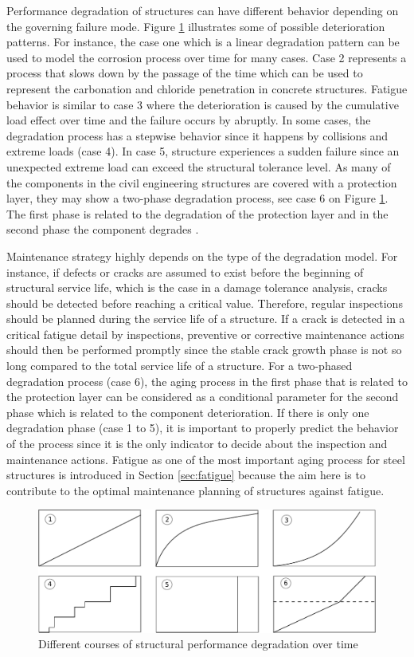Performance degradation of structures can have different behavior depending on the governing failure mode. Figure \ref{fig:degradation} illustrates some of possible 
deterioration patterns. For instance, the case one which is a linear degradation pattern can be used to model the corrosion process over time for many cases. 
Case 2 represents a process that slows down by the passage of the time which can be used to represent the carbonation and chloride penetration in concrete structures.
Fatigue behavior is similar to case 3 where the deterioration is caused by the cumulative load effect over time and the failure occurs by abruptly. 
In some cases, the degradation process has a stepwise behavior since it happens by collisions and extreme loads (case 4). In case 5, structure
experiences a sudden failure since an unexpected extreme load can exceed the structural tolerance level. As many of the components in the civil engineering structures are 
covered with a protection layer, they may show a two-phase degradation process, see case 6 on Figure \ref{fig:degradation}. The first phase is related to the degradation of the 
protection layer and in the second phase the component degrades \citep{Van1994}. 

Maintenance strategy highly depends on the type of the degradation model. 
For instance, if defects or cracks are assumed to exist before the beginning of structural service life, which is the case in a damage tolerance analysis, cracks should be detected 
before reaching a critical value. Therefore, regular inspections should be planned during the service life of a structure. If a crack is detected in a critical fatigue
detail by inspections, preventive or corrective maintenance actions should then be performed promptly since the stable crack growth phase is not so long compared to the total
service life of a structure. For a two-phased degradation process (case 6), the aging process in the first phase that is related to the protection layer can be considered as a 
conditional parameter for the second phase which is related to the component deterioration. If there is only one degradation phase (case 1 to 5), it is important to properly 
predict the behavior of the process since it is the only indicator to decide about the inspection and maintenance actions. Fatigue as one of the most important aging process for 
steel structures is introduced in Section \ref{sec:fatigue} because the aim here is to contribute to the optimal maintenance planning of structures against fatigue. 

\begin{figure}[hbt!]
\centering
  \includegraphics[width=0.75\linewidth]{figures/fig-ch1/degradation.pdf}
  \caption{Different courses of structural performance degradation over time}
  \label{fig:degradation}
\end{figure}


